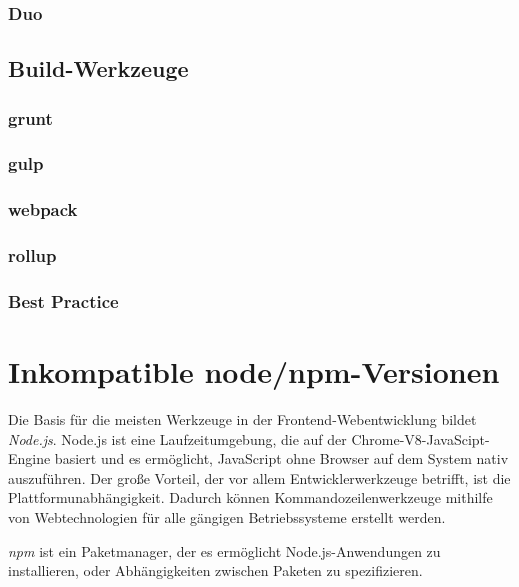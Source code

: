 \subsubsection{Duo}
\label{sub:duo}



\subsection{Build-Werkzeuge}
\label{sub:build-tools}


\subsubsection{grunt}
\label{sub:grunt}
\subsubsection{gulp}
\label{sub:gulp}
\subsubsection{webpack}
\label{sub:webpack}
\subsubsection{rollup}
\label{sub:rollup}
\subsubsection{Best Practice}
\label{sub:build-tools-best-practices}


\section{Inkompatible node/npm-Versionen}
Die Basis für die meisten Werkzeuge in der Frontend-Webentwicklung bildet \emph{Node.js}.
Node.js ist eine Laufzeitumgebung, die auf der Chrome-V8-JavaScipt-Engine basiert und es ermöglicht, JavaScript ohne Browser auf dem System nativ auszuführen.
Der große Vorteil, der vor allem Entwicklerwerkzeuge betrifft, ist die Plattformunabhängigkeit.
Dadurch können Kommandozeilenwerkzeuge mithilfe von Webtechnologien für alle gängigen Betriebssysteme erstellt werden.

\emph{npm} ist ein Paketmanager, der es ermöglicht Node.js-Anwendungen zu installieren, oder Abhängigkeiten zwischen Paketen zu spezifizieren.

